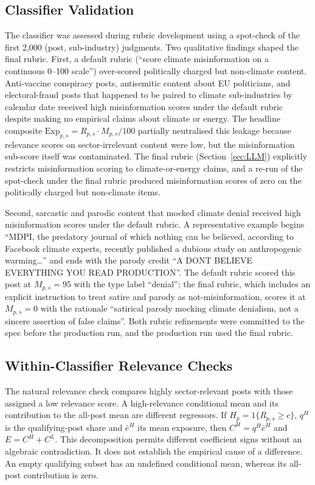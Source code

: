 \documentclass{article}
\theoremstyle{plain}
\begin{document}
\subsection{Classifier Validation}
The classifier was assessed during rubric development using a spot-check of the first 2,000 (post,
sub-industry) judgments. Two qualitative findings shaped the final rubric. First, a
default rubric (``score climate misinformation on a continuous 0--100 scale'')
over-scored politically charged but non-climate content. Anti-vaccine conspiracy
posts, antisemitic content about EU politicians, and electoral-fraud posts that
happened to be paired to climate sub-industries by calendar date received high
misinformation scores under the default rubric despite making no empirical claims
about climate or energy. The headline composite $\mathrm{Exp}_{p,s}=R_{p,s}\cdot
M_{p,s}/100$ partially neutralised this leakage because relevance scores on
sector-irrelevant content were low, but the misinformation sub-score itself was
contaminated. The final rubric (Section~\ref{sec:LLM}) explicitly restricts
misinformation scoring to climate-or-energy claims, and a re-run of the spot-check
under the final rubric produced misinformation scores of zero on the politically
charged but non-climate items.

Second, sarcastic and parodic content that mocked climate denial received high
misinformation scores under the default rubric. A representative example begins
``MDPI, the predatory journal of which nothing can be believed, according to
Facebook climate experts, recently published a dubious study on anthropogenic
warming\ldots'' and ends with the parody credit ``A DONT BELIEVE EVERYTHING YOU
READ PRODUCTION''. The default rubric scored this post at $M_{p,s}=95$ with the
type label ``denial''; the final rubric, which includes an explicit instruction to
treat satire and parody as not-misinformation, scores it at $M_{p,s}=0$ with the
rationale ``satirical parody mocking climate denialism, not a sincere assertion of
false claims''. Both rubric refinements were committed to the spec before the
production run, and the production run used the final rubric.

\subsection{Within-Classifier Relevance Checks}
The natural relevance check compares highly sector-relevant posts with those assigned a low relevance score. A high-relevance conditional mean and its contribution to the all-post mean are different regressors. If $H_p=1\{R_{p,s}\geq c\}$, $q^H$ is the qualifying-post share and $\bar e^H$ its mean exposure, then $C^H=q^H\bar e^H$ and $E=C^H+C^L$. This decomposition permits different coefficient signs without an algebraic contradiction. It does not establish the empirical cause of a difference. An empty qualifying subset has an undefined conditional mean, whereas its all-post contribution is zero.
\end{document}
